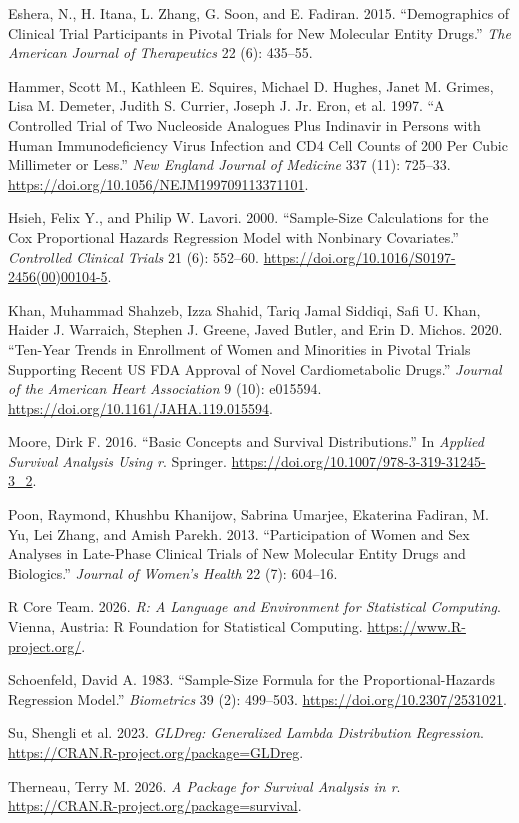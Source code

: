 \documentclass[
  letterpaper,
  DIV=11,
  numbers=noendperiod]{scrartcl}
\newlength{\cslhangindent}
\newenvironment{CSLReferences}[2] %
 {\begin{list}{}{%
  \setlength{\itemindent}{0pt}
  \setlength{\leftmargin}{0pt}
  \setlength{\parsep}{0pt}
  \ifodd #1
   \setlength{\leftmargin}{\cslhangindent}
   \setlength{\itemindent}{-1\cslhangindent}
  \fi
  \setlength{\itemsep}{#2\baselineskip}}}
 {\end{list}}
\begin{document}
\label{refs}
\begin{CSLReferences}{1}{0}
Eshera, N., H. Itana, L. Zhang, G. Soon, and E. Fadiran. 2015.
{``Demographics of Clinical Trial Participants in Pivotal Trials for New
Molecular Entity Drugs.''} \emph{The American Journal of Therapeutics}
22 (6): 435--55.

Hammer, Scott M., Kathleen E. Squires, Michael D. Hughes, Janet M.
Grimes, Lisa M. Demeter, Judith S. Currier, Joseph J. Jr. Eron, et al.
1997. {``A Controlled Trial of Two Nucleoside Analogues Plus Indinavir
in Persons with Human Immunodeficiency Virus Infection and CD4 Cell
Counts of 200 Per Cubic Millimeter or Less.''} \emph{New England Journal
of Medicine} 337 (11): 725--33.
\url{https://doi.org/10.1056/NEJM199709113371101}.

Hsieh, Felix Y., and Philip W. Lavori. 2000. {``Sample-Size Calculations
for the Cox Proportional Hazards Regression Model with Nonbinary
Covariates.''} \emph{Controlled Clinical Trials} 21 (6): 552--60.
\url{https://doi.org/10.1016/S0197-2456(00)00104-5}.

Khan, Muhammad Shahzeb, Izza Shahid, Tariq Jamal Siddiqi, Safi U. Khan,
Haider J. Warraich, Stephen J. Greene, Javed Butler, and Erin D. Michos.
2020. {``Ten-Year Trends in Enrollment of Women and Minorities in
Pivotal Trials Supporting Recent US FDA Approval of Novel
Cardiometabolic Drugs.''} \emph{Journal of the American Heart
Association} 9 (10): e015594.
\url{https://doi.org/10.1161/JAHA.119.015594}.

Moore, Dirk F. 2016. {``Basic Concepts and Survival Distributions.''} In
\emph{Applied Survival Analysis Using r}. Springer.
\url{https://doi.org/10.1007/978-3-319-31245-3_2}.

Poon, Raymond, Khushbu Khanijow, Sabrina Umarjee, Ekaterina Fadiran, M.
Yu, Lei Zhang, and Amish Parekh. 2013. {``Participation of Women and Sex
Analyses in Late-Phase Clinical Trials of New Molecular Entity Drugs and
Biologics.''} \emph{Journal of Women's Health} 22 (7): 604--16.

R Core Team. 2026. \emph{R: A Language and Environment for Statistical
Computing}. Vienna, Austria: R Foundation for Statistical Computing.
\url{https://www.R-project.org/}.

Schoenfeld, David A. 1983. {``Sample-Size Formula for the
Proportional-Hazards Regression Model.''} \emph{Biometrics} 39 (2):
499--503. \url{https://doi.org/10.2307/2531021}.

Su, Shengli et al. 2023. \emph{GLDreg: Generalized Lambda Distribution
Regression}. \url{https://CRAN.R-project.org/package=GLDreg}.

Therneau, Terry M. 2026. \emph{A Package for Survival Analysis in r}.
\url{https://CRAN.R-project.org/package=survival}.

\end{CSLReferences}
\end{document}
